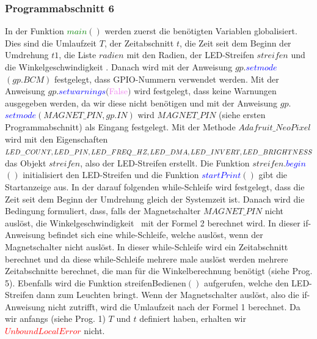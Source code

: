 \documentclass [a4paper, 11pt] {article}
\begin{document}
\subsubsection{Programmabschnitt 6}
In der Funktion \textcolor{green}{$main$}{$()$} werden zuerst die benötigten Variablen globalisiert. Dies sind die Umlaufzeit {$T$}, der Zeitabschnitt {$t$}, die Zeit seit dem Beginn der Umdrehung {$t1$}, die Liste {$radien$} mit den Radien, der LED-Streifen {$streifen$} und die Winkelgeschwindigkeit \textomega. Danach wird mit der Anweisung {$gp.$}\textcolor{blue}{$setmode$}{$(gp.BCM)$} festgelegt, dass GPIO-Nummern verwendet werden. Mit der Anweisung {$gp.$}\textcolor{blue}{$setwarnings$}{$($}\textcolor{violet}{False}{$)$} wird festgelegt, dass keine Warnungen ausgegeben werden, da wir diese nicht benötigen und mit der Anweisung {$gp.$}\textcolor{blue}{$setmode$}{$(MAGNET\_PIN, gp.IN)$} wird {$MAGNET\_PIN$} (siehe ersten Programmabschnitt) als Eingang festgelegt. Mit der Methode {$Adafruit\_NeoPixel$} wird mit den Eigenschaften {$LED\_COUNT, LED\_PIN, LED\_FREQ\\ \_HZ, LED\_DMA, LED\_INVERT, LED\_BRIGHTNESS$} das Objekt {$streifen$}, also der LED-Streifen erstellt. Die Funktion {$streifen.$}\textcolor{blue}{$begin$}{$()$} initialisiert den LED-Streifen und die Funktion \textcolor{blue}{$startPrint$}{$()$} gibt die Startanzeige aus. In der darauf folgenden while-Schleife wird festgelegt, dass die Zeit seit dem Beginn der Umdrehung gleich der Systemzeit ist. Danach wird die Bedingung formuliert, dass, falls der Magnetschalter {$MAGNET\_PIN$} nicht auslöst, die Winkelgeschwindigkeit \textomega\ mit der Formel 2 berechnet wird. In dieser if-Anweisung befindet sich eine while-Schleife, welche auslöst, wenn der Magnetschalter nicht auslöst. In dieser while-Schleife wird ein Zeitabschnitt berechnet und da diese while-Schleife mehrere male auslöst werden mehrere Zeitabschnitte berechnet, die man für die Winkelberechnung benötigt (siehe Prog. 5). Ebenfalls wird die Funktion streifenBedienen{$()$} aufgerufen, welche den LED-Streifen dann zum Leuchten bringt. Wenn der Magnetschalter auslöst, also die if-Anweisung nicht zutrifft, wird die Umlaufzeit nach der Formel 1 berechnet. Da wir anfangs (siehe Prog. 1) {$T$} und {$t$} definiert haben, erhalten wir \textcolor{red}{$UnboundLocalError$} nicht.
\end{document}
